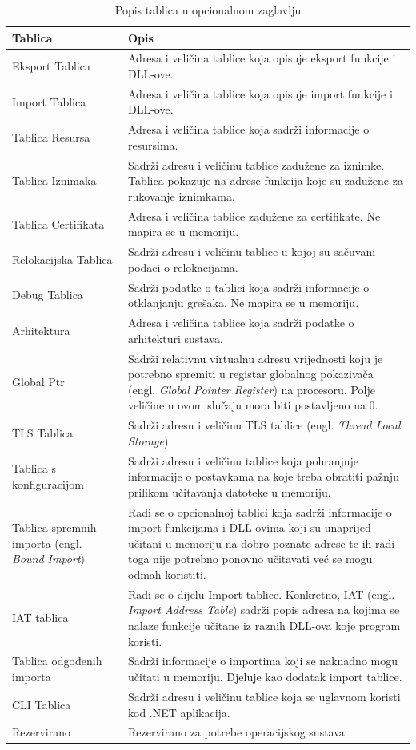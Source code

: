 \documentclass[times, utf8, diplomski, numeric]{fer}
\begin{document}
{\small
\begin{longtable}{|l|p{6cm}|}
\caption{Popis tablica u opcionalnom zaglavlju} \label{tbl:imgDataDir} \\
\hline
Tablica & Opis \\ \hline
Eksport Tablica & Adresa i veličina tablice koja opisuje eksport funkcije i DLL-ove. \\ \hline
Import Tablica &  Adresa i veličina tablice koja opisuje import funkcije i DLL-ove. \\ \hline
Tablica Resursa & Adresa i veličina tablice koja sadrži informacije o resursima. \\ \hline
Tablica Iznimaka & Sadrži adresu i veličinu tablice zadužene za iznimke. Tablica pokazuje na adrese funkcija koje su zadužene za rukovanje iznimkama. \\ \hline
Tablica Certifikata & Adresa i veličina tablice zadužene za certifikate. Ne mapira se u memoriju. \\ \hline
Relokacijska Tablica & Sadrži adresu i veličinu tablice u kojoj su sačuvani podaci o relokacijama. \\ \hline
Debug Tablica & Sadrži podatke o tablici koja sadrži informacije o otklanjanju grešaka. Ne mapira se u memoriju. \\ \hline
Arhitektura & Adresa i veličina tablice koja sadrži podatke o arhitekturi sustava. \\ \hline
Global Ptr & Sadrži relativnu virtualnu adresu vrijednosti koju je potrebno spremiti u registar globalnog pokazivača (engl. \emph{Global Pointer Register}) na procesoru. Polje veličine u ovom slučaju mora biti postavljeno na 0. \\ \hline
TLS Tablica & Sadrži adresu i veličinu TLS tablice (engl. \emph{Thread Local Storage}) \\ \hline
Tablica s konfiguracijom & Sadrži adresu i veličinu tablice koja pohranjuje informacije o postavkama na koje treba obratiti pažnju prilikom učitavanja datoteke u memoriju. \\ \hline
Tablica spremnih importa (engl. \emph{Bound Import}) & Radi se o opcionalnoj tablici koja sadrži informacije o import funkcijama i DLL-ovima koji su unaprijed učitani u memoriju na dobro poznate adrese te ih radi toga nije potrebno ponovno učitavati već se mogu odmah koristiti. \\ \hline
IAT tablica & Radi se o dijelu Import tablice. Konkretno, IAT (engl. \emph{Import Address Table}) sadrži popis adresa na kojima se nalaze funkcije učitane iz raznih DLL-ova koje program koristi. \\ \hline
Tablica odgođenih importa & Sadrži informacije o importima koji se naknadno mogu učitati u memoriju. Djeluje kao dodatak import tablice. \\ \hline
CLI Tablica & Sadrži adresu i veličinu tablice koja se uglavnom koristi kod .NET aplikacija. \\ \hline
Rezervirano & Rezervirano za potrebe operacijskog sustava. \\
\hline
\end{longtable}
}
\end{document}
